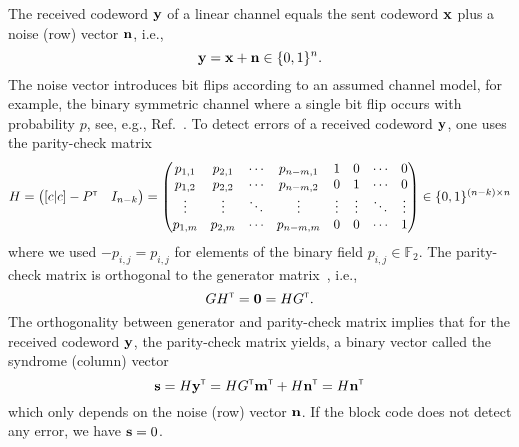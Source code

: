 The received codeword $\vb{y}$ of a linear channel equals the sent codeword $\vb{x}$ plus a noise (row) vector $\vb{n}$, i.e.,
\begin{equation}
	\vb{y}
	=
	\vb{x}
	+
	\vb{n}
	\in\{0,1\}^n
	.
\end{equation}
The noise vector introduces bit flips according to an assumed channel model, for example, the binary symmetric channel where a single bit flip occurs with probability $p$, see, e.g., Ref.~\cite[p.~148]{MacKay2003}.
To detect errors of a received codeword $\vb{y}$, one uses the parity-check matrix
\begin{equation}
	H
	=
	\begin{pmatrix}[c|c]
		-P^{\scriptscriptstyle\mathsf{T}} & I_{n-k}
	\end{pmatrix}
	=
	\begin{pmatrix}
		p_{1,1} & p_{2,1} & \cdots & p_{n-m,1} & 1 & 0 & \cdots & 0 \\
		p_{1,2} & p_{2,2} & \cdots & p_{n-m,2} & 0 & 1 & \cdots & 0 \\
		\vdots & \vdots & \ddots & \vdots & \vdots & \vdots & \ddots & \vdots \\
		p_{1,m} & p_{2,m} & \cdots & p_{n-m,m} & 0 & 0 & \cdots & 1 \\
	\end{pmatrix}
	\in\{0,1\}^{(n-k)\times n}
\end{equation}
where we used $-p_{i,j}=p_{i,j}$ for elements of the binary field $p_{i,j}\in\mathbb{F}_2$.
The parity-check matrix is orthogonal to the generator matrix~\cite[p.~95]{Mildenberger2013}, i.e.,
\begin{equation}
	GH^{\scriptscriptstyle\mathsf{T}}
	=
	\vb{0}
	=
	HG^{\scriptscriptstyle\mathsf{T}}
	.
\end{equation}
The orthogonality between generator and parity-check matrix implies that for the received codeword $\vb{y}$, the parity-check matrix yields, a binary vector called the syndrome (column) vector
\begin{equation}
	\vb{s}
	=
	H\vb{y}^{\scriptscriptstyle\mathsf{T}}
	=
	HG^{\scriptscriptstyle\mathsf{T}}\vb{m}^{\scriptscriptstyle\mathsf{T}}
	+
	H\vb{n}^{\scriptscriptstyle\mathsf{T}}
	=
	H\vb{n}^{\scriptscriptstyle\mathsf{T}}
\end{equation}
which only depends on the noise (row) vector $\vb{n}$.
If the block code does not detect any error, we have $\vb{s}=0$.
